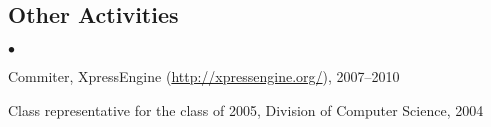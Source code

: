 \documentclass[margin,line]{res}
\newenvironment{list1}{
  \begin{list}{\ding{113}}{%
      \setlength{\itemsep}{0in}
      \setlength{\parsep}{0in} \setlength{\parskip}{0in}
      \setlength{\topsep}{0in} \setlength{\partopsep}{0in}
      \setlength{\leftmargin}{0.17in}}}{\end{list}}
\newenvironment{list2}{
  \begin{list}{$\bullet$}{%
      \setlength{\itemsep}{0in}
      \setlength{\parsep}{0in} \setlength{\parskip}{0in}
      \setlength{\topsep}{0in} \setlength{\partopsep}{0in}
      \setlength{\leftmargin}{0.2in}}}{\end{list}}
\begin{document}
\begin{resume}
\section{\sc Other Activities}
\begin{list2}
\item{Commiter, XpressEngine (\url{http://xpressengine.org/}), 2007--2010 }
\item{Class representative for the class of 2005, Division of Computer Science, 2004}\\
\end{list2}

\end{resume}
\end{document}

